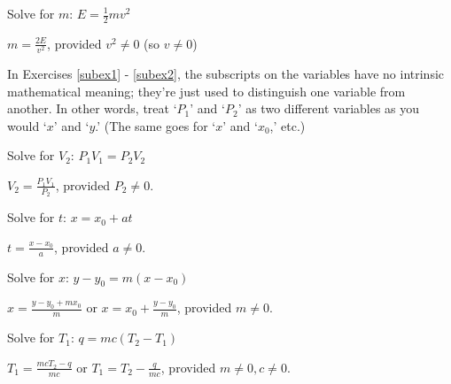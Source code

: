 \documentclass{ximera}
\begin{document}
\begin{question}
\begin{problem}
Solve for $m$:  $E = \frac{1}{2} mv^2$

\begin{solution}
$m = \frac{2E}{v^2}$, provided $v^2 \neq 0$ (so $v \neq 0$)
\end{solution}
\end{problem}

In Exercises \ref{subex1} - \ref{subex2}, the subscripts on the variables have no intrinsic mathematical meaning; they're just used to distinguish one variable from another.  In other words, treat `$P_{1}$' and `$P_{2}$'  as two different variables as you would `$x$' and `$y$.'  (The same goes for `$x$' and `$x_{0}$,'  etc.)

\begin{problem} \label{subex1}
Solve for $V_{2}$:  $P_{1}V_{1} = P_{2}V_{2}$ 

\begin{solution}
$V_{2} = \frac{P_{1}V_{1}}{P_{2}}$, provided $P_{2} \neq 0$. 
\end{solution}
\end{problem}

\begin{problem}
Solve for $t$:  $x = x_{0} + at$ 

\begin{solution}
$t = \frac{x - x_{0}}{a}$, provided $a \neq 0$.
\end{solution}
\end{problem}

\begin{problem}
Solve for $x$:   $y-y_{0} = m(x -x_{0})$

\begin{solution}
$x = \frac{y-y_{0} + mx_{0}}{m}$ or $x = x_{0} + \frac{y-y_{0}}{m}$, provided $m \neq 0$. 
\end{solution}
\end{problem}

\begin{problem} \label {subex2} \label{literalexlast}
Solve for $T_{1}$:  $q = mc(T_{2} -T_{1})$ 

\begin{solution}
$T_{1} = \frac{mcT_{2} - q}{mc}$ or $T_{1} = T_{2} - \frac{q}{mc} $, provided $m \neq 0, c \neq 0$.  
\end{solution}
\end{problem}

\end{question}
\end{document}
